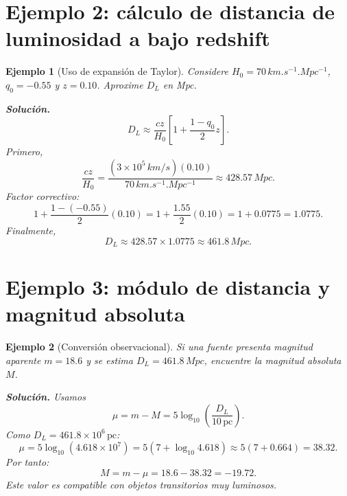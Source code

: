 \documentclass[12pt,oneside]{book}
\newtheorem{ejemplo}{Ejemplo}[chapter]
\begin{document}
\section{Ejemplo 2: cálculo de distancia de luminosidad a bajo redshift}

\begin{ejemplo}[Uso de expansión de Taylor]
Considere $H_0=70\,\si{km.s^{-1}.Mpc^{-1}}$, $q_0=-0.55$ y $z=0.10$.
Aproxime $D_L$ en Mpc.

\textbf{Solución.}
\begin{equation}
  D_L\approx\frac{cz}{H_0}\left[1+\frac{1-q_0}{2}z\right].
\end{equation}
Primero,
\begin{equation}
  \frac{cz}{H_0}=\frac{(3\times10^5\,\si{km/s})(0.10)}{70\,\si{km.s^{-1}.Mpc^{-1}}}
  \approx428.57\,\si{Mpc}.
\end{equation}
Factor correctivo:
\begin{equation}
  1+\frac{1-(-0.55)}{2}(0.10)=1+\frac{1.55}{2}(0.10)=1+0.0775=1.0775.
\end{equation}
Finalmente,
\begin{equation}
  D_L\approx428.57\times1.0775\approx461.8\,\si{Mpc}.
\end{equation}
\end{ejemplo}

\section{Ejemplo 3: módulo de distancia y magnitud absoluta}

\begin{ejemplo}[Conversión observacional]
Si una fuente presenta magnitud aparente $m=18.6$ y se estima
$D_L=461.8\,\si{Mpc}$, encuentre la magnitud absoluta $M$.

\textbf{Solución.}
Usamos
\begin{equation}
  \mu = m-M = 5\log_{10}\left(\frac{D_L}{10\,\mathrm{pc}}\right).
\end{equation}
Como $D_L=461.8\times10^6\,\mathrm{pc}$:
\begin{equation}
  \mu=5\log_{10}(4.618\times10^7)=5(7+\log_{10}4.618)
  \approx5(7+0.664)=38.32.
\end{equation}
Por tanto:
\begin{equation}
  M=m-\mu=18.6-38.32=-19.72.
\end{equation}
Este valor es compatible con objetos transitorios muy luminosos.
\end{ejemplo}
\end{document}
